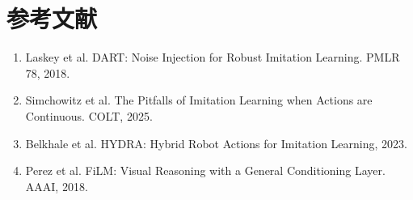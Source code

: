 \documentclass[UTF8,a4paper,11pt,fontset=none]{ctexart}
\begin{document}
\section*{参考文献}
\begin{enumerate}
\item Laskey et al. DART: Noise Injection for Robust Imitation Learning. PMLR 78, 2018.
\item Simchowitz et al. The Pitfalls of Imitation Learning when Actions are Continuous. COLT, 2025.
\item Belkhale et al. HYDRA: Hybrid Robot Actions for Imitation Learning, 2023.
\item Perez et al. FiLM: Visual Reasoning with a General Conditioning Layer. AAAI, 2018.
\end{enumerate}
\end{document}
